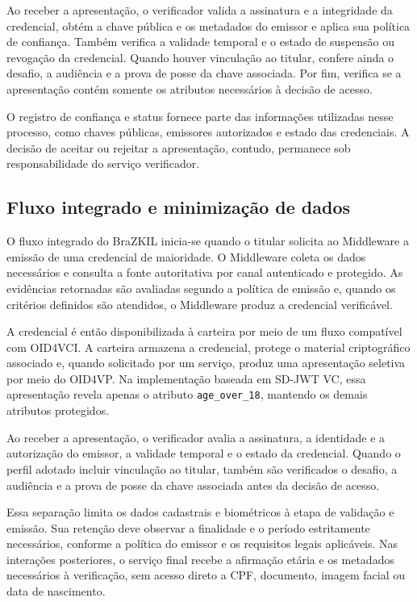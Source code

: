 \documentclass[12pt]{article}
\begin{document}
Ao receber a apresentação, o verificador valida a assinatura e a integridade da credencial, obtém a chave pública e os metadados do emissor e aplica sua política de confiança. Também verifica a validade temporal e o estado de suspensão ou revogação da credencial. Quando houver vinculação ao titular, confere ainda o desafio, a audiência e a prova de posse da chave associada. Por fim, verifica se a apresentação contém somente os atributos necessários à decisão de acesso.

O registro de confiança e status fornece parte das informações utilizadas nesse processo, como chaves públicas, emissores autorizados e estado das credenciais. A decisão de aceitar ou rejeitar a apresentação, contudo, permanece sob responsabilidade do serviço verificador.

\subsection{Fluxo integrado e minimização de dados}
\label{sec:fluxo-integrado}

O fluxo integrado do BraZKIL inicia-se quando o titular solicita ao Middleware a emissão de uma credencial de maioridade. O Middleware coleta os dados necessários e consulta a fonte autoritativa por canal autenticado e protegido. As evidências retornadas são avaliadas segundo a política de emissão e, quando os critérios definidos são atendidos, o Middleware produz a credencial verificável.

A credencial é então disponibilizada à carteira por meio de um fluxo compatível com OID4VCI. A carteira armazena a credencial, protege o material criptográfico associado e, quando solicitado por um serviço, produz uma apresentação seletiva por meio do OID4VP. Na implementação baseada em SD-JWT VC, essa apresentação revela apenas o atributo \texttt{age\_over\_18}, mantendo os demais atributos protegidos.

Ao receber a apresentação, o verificador avalia a assinatura, a identidade e a autorização do emissor, a validade temporal e o estado da credencial. Quando o perfil adotado incluir vinculação ao titular, também são verificados o desafio, a audiência e a prova de posse da chave associada antes da decisão de acesso.

Essa separação limita os dados cadastrais e biométricos à etapa de validação e emissão. Sua retenção deve observar a finalidade e o período estritamente necessários, conforme a política do emissor e os requisitos legais aplicáveis. Nas interações posteriores, o serviço final recebe a afirmação etária e os metadados necessários à verificação, sem acesso direto a CPF, documento, imagem facial ou data de nascimento.
\end{document}
